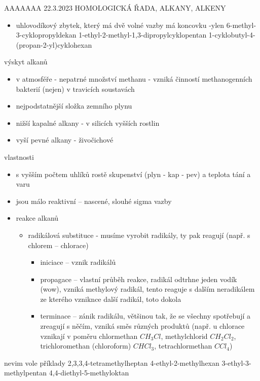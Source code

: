 \documentclass{article}
\begin{document}
AAAAAAA 22.3.2023 HOMOLOGICKÁ ŘADA, ALKANY, ALKENY
\begin{itemize}
  \item uhlovodíkový zbytek, který má dvě volné vazby má koncovku -ylen
  6-methyl-3-cyklopropyldekan
  1-ethyl-2-methyl-1,3-dipropylcyklopentan
  1-cyklobutyl-4-(propan-2-yl)cyklohexan
\end{itemize}
výskyt alkanů
\begin{itemize}
  \item v atmosféře - nepatrné množství methanu - vzniká činností methanogenních bakterií (nejen) v travicích soustavách
  \item nejpodstatnější složka zemního plynu
  \item nižší kapalné alkany - v silicích vyšších rostlin
  \item vyší pevné alkany - živočichové
\end{itemize}
vlastnosti
\begin{itemize}
  \item s vyšším počtem uhlíků rostě skupenství (plyn - kap - pev) a teplota tání a varu
  \item jsou málo reaktivní -- nascené, slouhé sigma vazby
  \item reakce alkanů
  \begin{itemize}
    \item radikálová substituce - musíme vyrobit radikály, ty pak reagují (např. s chlorem -- chlorace)
    \begin{itemize}
      \item iniciace -- vznik radikálů
      \item propagace -- vlastní průběh reakce, radikál odtrhne jeden vodík (wow), vzniká methylový radikál, tento reaguje s dalším neradikálem ze kterého vzniknce další radikál, toto dokola
      \item terminace -- zánik radikálu, většinou tak, že se všechny spotřebují a zreagují s něčím, vzniká směs různých produktů (např. u chlorace vznikají v poměru chlormethan $CH_3Cl$, methylchlorid $CH_2Cl_2$, trichloromethan (chloroform) $CHCl_3$, tetrachlormethan $CCl_4$)
    \end{itemize}
  \end{itemize}
\end{itemize}

nevim vole příklady
2,3,3,4-tetramethylheptan
4-ethyl-2-methylhexan
3-ethyl-3-methylpentan
4,4-diethyl-5-methyloktan
\end{document}
